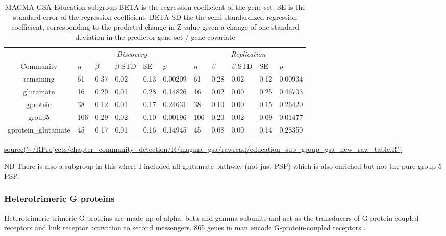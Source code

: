 \begin{table}[ht]
\centering
\begin{adjustbox}{width=\textwidth}

\setlength{\extrarowheight}{2pt}
\begin{tabular}{cllllllllll}
  \toprule
   &  \multicolumn{5}{c}{\textit{Discovery}} & \multicolumn{5}{c}{\textit{Replication}} \\
    \cmidrule{2-11}
Community & $n$ & $\beta$ & $\beta$ STD & SE & $p$ & $n$ & $\beta$ & $\beta$ STD & SE & $p$\\ 
  \midrule
remaining & 61 & 0.37 & 0.02 & 0.13 & 0.00209 & 61 & 0.28 & 0.02 & 0.12 & 0.00934 \\ 
  glutamate & 16 & 0.29 & 0.01 & 0.28 & 0.14826 & 16 & 0.02 & 0.00 & 0.25 & 0.46703 \\ 
  gprotein & 38 & 0.12 & 0.01 & 0.17 & 0.24631 & 38 & 0.10 & 0.00 & 0.15 & 0.26420 \\ 
  group5 & 106 & 0.29 & 0.02 & 0.10 & 0.00196 & 106 & 0.20 & 0.02 & 0.09 & 0.01477 \\ 
  gprotein\_glutamate & 45 & 0.17 & 0.01 & 0.16 & 0.14945 & 45 & 0.08 & 0.00 & 0.14 & 0.28350 \\ 
   \bottomrule
\end{tabular}
\end{adjustbox}
\caption{MAGMA GSA Education subgroup  BETA is the regression coefficient of the gene set. SE is the standard error of the regression coefficient. BETA SD the the semi-standardized regression coefficient, corresponding to the predicted
change in Z-value given a change of one standard deviation in the predictor gene set / gene covariate } 
\tiny\url{source('~/RProjects/chapter_community_detection/R/magma_gsa/rawread/education_sub_group_gsa_new_raw_table.R')}
\label{tab:MAGMA GSA Education sub}
\end{table}

NB There is also a subgroup in this where I included all glutamate pathway (not just PSP) which is also enriched but not the pure group 5 PSP.


\subsubsection{Heterotrimeric G proteins}
Heterotrimeric trimeric G proteins are made up of alpha, beta and gamma subunits and act as the transducers of G protein coupled receptors and link receptor activation to second messengers. 865 genes in man encode G-protein-coupled receptors \cite{milligan2006heterotrimeric} .

